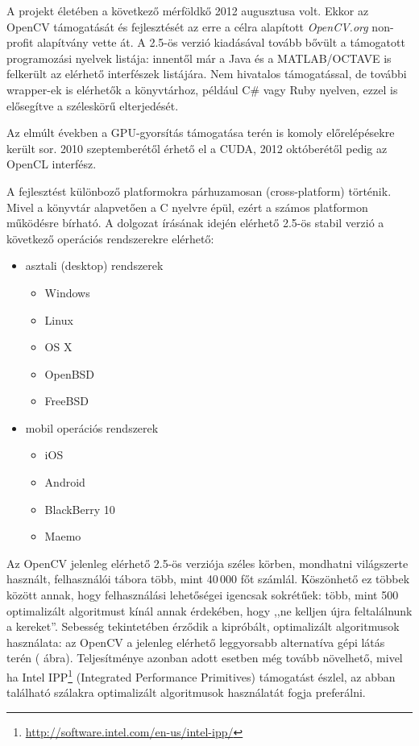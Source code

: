 A projekt életében a következő mérföldkő 2012 augusztusa volt. Ekkor az OpenCV támogatását és fejlesztését az erre a célra alapított \emph{OpenCV.org} non-profit alapítvány vette át. A 2.5-ös verzió kiadásával tovább bővült a támogatott programozási nyelvek listája: innentől már a Java és a MATLAB/OCTAVE is felkerült az elérhető interfészek listájára. Nem hivatalos támogatással, de további wrapper-ek is elérhetők a könyvtárhoz, például C\# vagy Ruby nyelven, ezzel is elősegítve a széleskörű elterjedését. 

Az elmúlt években a GPU-gyorsítás támogatása terén is komoly előrelépésekre került sor. 2010 szeptemberétől érhető el a CUDA, 2012 októberétől pedig az OpenCL interfész.

\bigskip

A fejlesztést különboző platformokra párhuzamosan (cross-platform) történik. Mivel a könyvtár alapvetően a C nyelvre épül, ezért a számos platformon működésre bírható. A dolgozat írásának idején elérhető 2.5-ös stabil verzió a következő operációs rendszerekre elérhető:

\begin{itemize}
  \item asztali (desktop) rendszerek
  \begin{itemize}
    \item Windows
    \item Linux
    \item OS X
    \item OpenBSD
    \item FreeBSD  
  \end{itemize}
  \item mobil operációs rendszerek
  \begin{itemize}
    \item iOS
    \item Android
    \item BlackBerry 10
    \item Maemo
  \end{itemize}   
\end{itemize}

\bigskip

Az OpenCV jelenleg elérhető 2.5-ös verziója széles körben, mondhatni világszerte használt, felhasználói tábora több, mint 40\,000 főt számlál. Köszönhető ez többek között annak, hogy felhasználási lehetőségei igencsak sokrétűek: több, mint 500 optimalizált algoritmust kínál annak érdekében, hogy ,,ne kelljen újra feltalálnunk a kereket''. Sebesség tekintetében érződik a kipróbált, optimalizált algoritmusok használata: az OpenCV a jelenleg elérhető leggyorsabb alternatíva gépi látás terén ( ábra). Teljesítménye azonban adott esetben még tovább növelhető, mivel ha Intel IPP\footnote{\url{http://software.intel.com/en-us/intel-ipp/}} (Integrated Performance Primitives) támogatást észlel, az abban található szálakra optimalizált algoritmusok használatát fogja preferálni.

